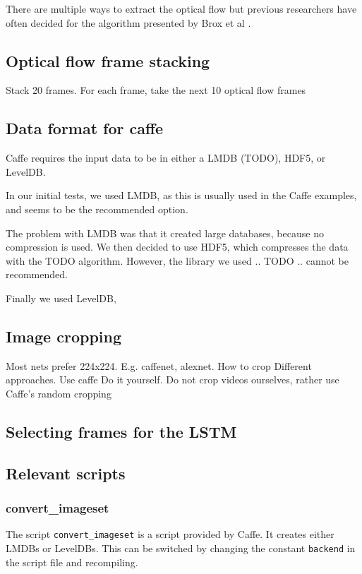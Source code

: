 There are multiple ways to extract the optical flow but previous researchers  have often decided for the algorithm presented by Brox et al \cite{brox2004high}.


\subsection{Optical flow frame stacking}
\item Stack 20 frames. For each frame, take the next 10 optical flow frames


\subsection{Data format for caffe}
Caffe requires the input data to be in either a LMDB (TODO), HDF5, or LevelDB.

In our initial tests, we used LMDB, as this is usually used in the Caffe examples, and seems to be the recommended option.

The problem with LMDB was that it created large databases, because no compression is used.
We then decided to use HDF5, which compresses the data with the TODO algorithm.
However, the library we used .. TODO .. cannot be recommended.

Finally we used LevelDB,



\subsection{Image cropping}
Most nets prefer 224x224. E.g. caffenet, alexnet.
How to crop
Different approaches.
Use caffe
Do it yourself.
Do not crop videos ourselves, rather use Caffe's random cropping

\subsection{Selecting frames for the LSTM}


\subsection{Relevant scripts}

\subsubsection{convert\_imageset}
The script \texttt{convert\_imageset} is a script provided by Caffe.
It creates either LMDBs or LevelDBs.
This can be switched by changing the constant \texttt{backend} in the script file and recompiling.

